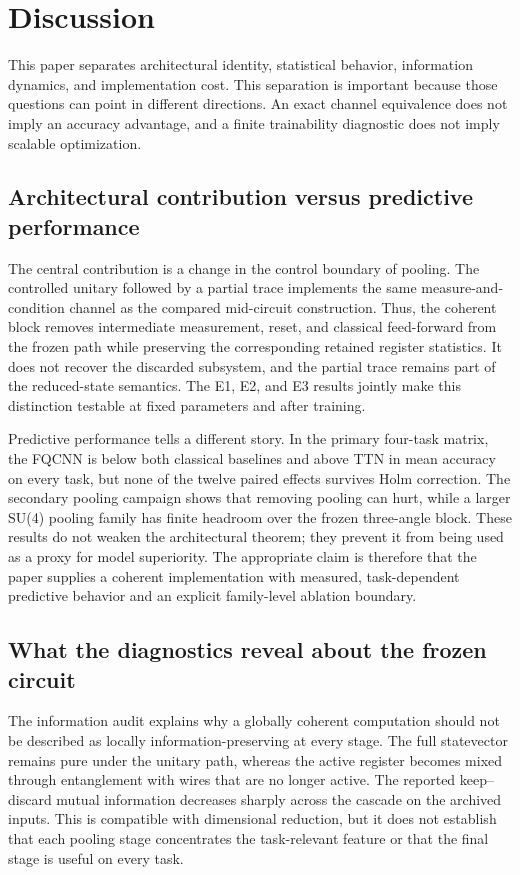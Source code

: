 \documentclass[conference]{IEEEtran}
\begin{document}
\section{Discussion}
This paper separates architectural identity, statistical behavior,
information dynamics, and implementation cost. This separation is important
because those questions can point in different directions. An exact channel
equivalence does not imply an accuracy advantage, and a finite trainability
diagnostic does not imply scalable optimization.

\subsection{Architectural contribution versus predictive performance}
The central contribution is a change in the control boundary of pooling. The
controlled unitary followed by a partial trace implements the same
measure-and-condition channel as the compared mid-circuit construction. Thus,
the coherent block removes intermediate measurement, reset, and classical
feed-forward from the frozen path while preserving the corresponding retained
register statistics. It does not recover the discarded subsystem, and the
partial trace remains part of the reduced-state semantics. The E1, E2, and E3
results jointly make this distinction testable at fixed parameters and after
training.

Predictive performance tells a different story. In the primary four-task
matrix, the FQCNN is below both classical baselines and above TTN in mean
accuracy on every task, but none of the twelve paired effects survives Holm
correction. The secondary pooling campaign shows that removing pooling can
hurt, while a larger SU(4) pooling family has finite headroom over the frozen
three-angle block. These results do not weaken the architectural theorem; they
prevent it from being used as a proxy for model superiority. The appropriate
claim is therefore that the paper supplies a coherent implementation with
measured, task-dependent predictive behavior and an explicit family-level
ablation boundary.

\subsection{What the diagnostics reveal about the frozen circuit}
The information audit explains why a globally coherent computation should not
be described as locally information-preserving at every stage. The full
statevector remains pure under the unitary path, whereas the active register
becomes mixed through entanglement with wires that are no longer active. The
reported keep--discard mutual information decreases sharply across the
cascade on the archived inputs. This is compatible with dimensional reduction,
but it does not establish that each pooling stage concentrates the task-relevant
feature or that the final stage is useful on every task.
\end{document}

